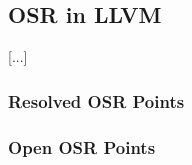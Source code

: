 \subsection{OSR in LLVM}
\label{se:osr-llvm}

[...]

\subsubsection{Resolved OSR Points}

\subsubsection{Open OSR Points}
  
  
  
  
  